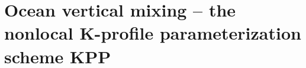 \section{Ocean vertical mixing -- 
the nonlocal K-profile parameterization scheme KPP
\label{sectionkpp}}

